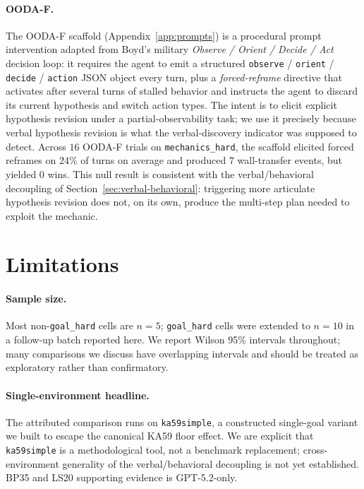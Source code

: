 \documentclass{article}
\begin{document}
\paragraph{OODA-F.} The OODA-F scaffold (Appendix~\ref{app:prompts}) is a procedural prompt intervention adapted from Boyd's military \emph{Observe / Orient / Decide / Act} decision loop: it requires the agent to emit a structured \texttt{observe} / \texttt{orient} / \texttt{decide} / \texttt{action} JSON object every turn, plus a \emph{forced-reframe} directive that activates after several turns of stalled behavior and instructs the agent to discard its current hypothesis and switch action types. The intent is to elicit explicit hypothesis revision under a partial-observability task; we use it precisely because verbal hypothesis revision is what the verbal-discovery indicator was supposed to detect. Across $16$ OODA-F trials on \texttt{mechanics\_hard}, the scaffold elicited forced reframes on $24\%$ of turns on average and produced $7$ wall-transfer events, but yielded $0$ wins. This null result is consistent with the verbal/behavioral decoupling of Section~\ref{sec:verbal-behavioral}: triggering more articulate hypothesis revision does not, on its own, produce the multi-step plan needed to exploit the mechanic.

\section{Limitations}
\label{sec:limits}
\paragraph{Sample size.}
Most non-\texttt{goal\_hard} cells are $n=5$; \texttt{goal\_hard} cells were extended to $n=10$ in a follow-up batch reported here. We report Wilson 95\% intervals throughout; many comparisons we discuss have overlapping intervals and should be treated as exploratory rather than confirmatory.

\paragraph{Single-environment headline.}
The attributed comparison runs on \texttt{ka59simple}, a constructed single-goal variant we built to escape the canonical KA59 floor effect. We are explicit that \texttt{ka59simple} is a methodological tool, not a benchmark replacement; cross-environment generality of the verbal/behavioral decoupling is not yet established. BP35 and LS20 supporting evidence is GPT-5.2-only.
\end{document}

